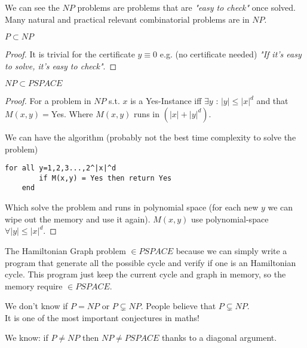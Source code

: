 \begin{remark} We can see the $NP$ problems are problems that are \textit{"easy to check"} once solved.
Many natural and practical relevant combinatorial problems are in $NP$.
\end{remark}
\vspace{0.5cm}
\begin{theorem}$P\subset NP$
\end{theorem}
\begin{proof}
It is trivial for the certificate $y\equiv 0$ e.g. (no certificate needed) \textit{"If it's easy to solve, it's easy to check"}.
\end{proof}
\vspace{0.5cm}
\begin{theorem} $NP \subset PSPACE$
\end{theorem}
\begin{proof}
For a problem in $NP$ s.t. $x$ is a Yes-Instance iff $\exists y$ : $|y|\leq|x|^d$ and  that
$M(x,y)=$Yes. Where $M(x,y)$ runs in $(|x|+|y|^d)$.

We can have the algorithm (probably not the best time complexity to solve the problem)
\begin{lstlisting}[caption=$NP \subset PSPACE$ control algorithm]
    for all y=1,2,3...,2^|x|^d
        if M(x,y) = Yes then return Yes
    end
\end{lstlisting}

Which solve the problem and runs in polynomial space (for each new $y$ we can wipe out the memory and use it again). $M(x,y)$ use polynomial-space $\forall |y| \leq |x|^d$.
\end{proof}
\vspace{0.5cm}
\begin{remark}
The Hamiltonian Graph problem $\in PSPACE$ because we can simply write a program that generate all the possible cycle and
verify if one is an Hamiltonian cycle. This program just keep the current cycle and graph in memory, so the memory require $\in PSPACE$.
\end{remark}
\vspace{0.5cm}
We don't know if $P=NP$ or $P\subsetneq NP$. People believe that $P\subsetneq NP$.\\
It is one of the most important conjectures in maths!
\\
\begin{remark}
We know: if $P\neq NP$ then $NP\neq PSPACE$ thanks to a diagonal argument.
\end{remark}

